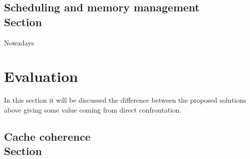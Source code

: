 \documentclass[a4paper,10pt]{article}
\begin{document}
\begin{multicols}{2}
\subsection{Scheduling and memory management \\ Section}

Nowadays 

\section{Evaluation}

In this section it will be discussed the difference between the proposed solutions above giving some value coming from direct confrontation.

\subsection{Cache coherence \\ Section}


\end{multicols}
\end{document}
